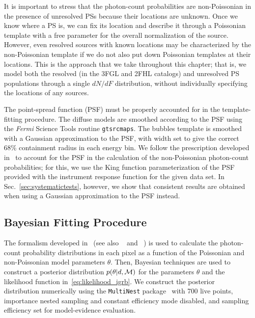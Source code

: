 It is important to stress that the photon-count probabilities are non-Poissonian in the presence of unresolved PSs because their locations are unknown.  Once we know where a PS is, we can fix its location and describe it through a Poissonian template with a free parameter for the overall normalization of the source.  However, even  resolved sources with known locations may be characterized by the non-Poissonian template if we do not also put down Poissonian templates at their locations.  This is the approach that we take throughout this chapter; that is, we model both the resolved (in the 3FGL and 2FHL catalogs) and unresolved PS populations through a single $dN/dF$ distribution, without individually specifying the locations of any sources.    

The point-spread function (PSF) must be properly accounted for in the template-fitting procedure.  The diffuse models are smoothed according to the PSF using the {\it Fermi} Science Tools routine \texttt{gtsrcmaps}.  The bubbles template is smoothed with a Gaussian approximation to the PSF, with width set to give the correct 68\% containment radius in each energy bin.  We follow the prescription developed in~\cite{Malyshev:2011zi} to account for the PSF in the calculation of the non-Poissonian photon-count probabilities; for this, we use the King function parameterization of the PSF provided with the instrument response function for the given data set.  In Sec.~\ref{sec:systematictests}, however, we show that consistent results are obtained when using a Gaussian approximation to the PSF instead.    
 
\subsection{Bayesian Fitting Procedure} 
 
The formalism developed in~\cite{Malyshev:2011zi,Lee:2014mza,Lee:2015fea} (see also ~\cite{Zechlin:2015wdz} and ~\cite{Linden:2016rcf}) is used to calculate the photon-count probability distributions in each pixel as a function of the Poissonian and non-Poissonian model parameters $\theta$.  Then, Bayesian techniques are used to construct a posterior distribution $p(\theta | d, {\cal M})$ for the parameters $\theta$ and the likelihood function in~\eqref{eq:likelihood_igrb}.  We construct the posterior distribution numerically using the \texttt{MultiNest} package~\cite{Feroz:2008xx,Buchner:2014nha} with 700 live points, importance nested sampling and constant efficiency mode disabled, and sampling efficiency set for model-evidence evaluation.  
 
